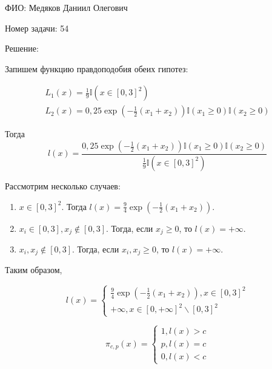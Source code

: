 \documentclass[14pt]{extarticle}
\begin{document}
ФИО: Медяков Даниил Олегович

\vspace{10pt}

Номер задачи: 54

\vspace{10pt}

Решение:

\vspace{10pt}

Запишем функцию правдоподобия обеих гипотез:

\begin{gather*}
    L_1(x) = \frac{1}{9}\mathbb{I}(x\in[0,3]^2)\\
    L_2(x) = 0,25\exp(-\frac{1}{2}(x_1 + x_2))\mathbb I(x_1\geqslant 0)\mathbb I(x_2\geqslant 0)
\end{gather*}

Тогда 
\begin{equation*}
    l(x) = \frac{0,25\exp(-\frac{1}{2}(x_1 + x_2))\mathbb I(x_1\geqslant 0)\mathbb I(x_2\geqslant 0)}{\frac{1}{9}\mathbb{I}(x\in[0,3]^2)}
\end{equation*}

Рассмотрим несколько случаев:

\begin{enumerate}
    \item $x\in [0,3]^2$. Тогда $l(x) = \frac{9}{4}\exp(-\frac{1}{2}(x_1 + x_2))$.
    \item $x_i \in [0,3], x_j\notin[0,3]$. Тогда, если $x_j \geqslant 0$, то $l(x) = +\infty$.
    \item $x_i, x_j \notin [0,3]$. Тогда, если $x_i, x_j \geqslant 0$, то $l(x) = +\infty$.
\end{enumerate}

Таким образом,

\begin{equation*}
    l(x) = 
    \begin{cases}
        \frac{9}{4}\exp(-\frac{1}{2}(x_1 + x_2)), x\in[0,3]^2\\
        +\infty, x\in [0, +\infty]^2\backslash[0,3]^2
    \end{cases}
\end{equation*}

\begin{equation*}
    \pi_{c, p}(x) = 
    \begin{cases}
        1, l(x) > c\\
        p, l(x) = c\\
        0, l(x) < c
    \end{cases}
\end{equation*}
\end{document}
